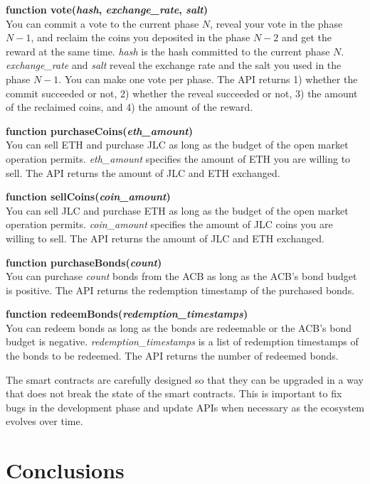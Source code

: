 \documentclass[dvipdfmx,a4paper]{article}
\begin{document}
\begin{description}
\item{\textbf{function vote(\textit{hash}, \textit{exchange\_rate}, \textit{salt})}}\\
You can commit a vote to the current phase $N$, reveal your vote in the phase $N-1$, and reclaim the coins you deposited in the phase $N-2$ and get the reward at the same time. \textit{hash} is the hash committed to the current phase $N$. \textit{exchange\_rate} and \textit{salt} reveal the exchange rate and the salt you used in the phase $N-1$. You can make one vote per phase. The API returns 1) whether the commit succeeded or not, 2) whether the reveal succeeded or not, 3) the amount of the reclaimed coins, and 4) the amount of the reward.
\item{\textbf{function purchaseCoins(\textit{eth\_amount})}}\\
You can sell ETH and purchase JLC as long as the budget of the open market operation permits. \textit{eth\_amount} specifies the amount of ETH you are willing to sell. The API returns the amount of JLC and ETH exchanged.
\item{\textbf{function sellCoins(\textit{coin\_amount})}}\\
You can sell JLC and purchase ETH as long as the budget of the open market operation permits. \textit{coin\_amount} specifies the amount of JLC coins you are willing to sell. The API returns the amount of JLC and ETH exchanged.
\item{\textbf{function purchaseBonds(\textit{count})}}\\
You can purchase \textit{count} bonds from the ACB as long as the ACB's bond budget is positive. The API returns the redemption timestamp of the purchased bonds.
\item{\textbf{function redeemBonds(\textit{redemption\_timestamps})}}\\
You can redeem bonds as long as the bonds are redeemable or the ACB's bond budget is negative. \textit{redemption\_timestamps} is a list of redemption timestamps of the bonds to be redeemed. The API returns the number of redeemed bonds.
\end{description}

The smart contracts are carefully designed so that they can be upgraded in a way that does not break the state of the smart contracts. This is important to fix bugs in the development phase and update APIs when necessary as the ecosystem evolves over time.

\section{Conclusions}
\end{document}
